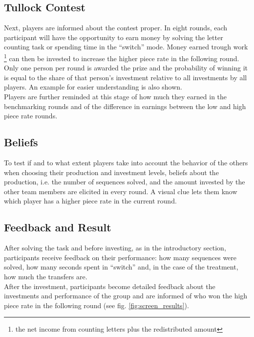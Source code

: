     \subsection{Tullock Contest}
    
    Next, players are informed  about the contest proper. In eight rounds, each participant will have the opportunity to earn money by solving the letter counting task or spending time in the ``switch'' mode. Money earned trough work \footnote{the net income from counting letters plus the redistributed amount} can then be invested to increase the higher piece rate in the following round. Only one person per round is awarded the prize and the probability of winning it is equal to the share of that person's investment relative to all investments by all players. An example for easier understanding is also shown.\\
    
    Players are further reminded at this stage of how much they earned in the benchmarking rounds and of the difference in earnings between the low and high piece rate rounds.
    
    \subsection{Beliefs}
    
    To test if and to what extent players take into account the behavior of the others when choosing their production and investment levels, beliefs about the production, i.e. the number of sequences solved, and the amount invested by the other team members are elicited in every round. A visual clue lets them know which player has a higher piece rate in the current round.
    
    \subsection{Feedback and Result}
    
    After solving the task and before investing, as in the introductory section, participants receive feedback on their performance: how many sequences were solved, how many seconds spent in ``switch'' and, in the case of the treatment, how much the transfers are.\\
    
    After the investment, participants become detailed feedback about the investments and performance of the group and are informed of who won the high piece rate in the following round (see fig. \ref{fig:screen_results}).
    
